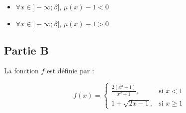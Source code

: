 \documentclass[12pt,a4paper]{article}
\begin{document}
\begin{itemize}
          \begin{center}
          \end{center}
          \begin{itemize}
              \item $\forall x \in ]-\infty ; \beta[$, $\mu(x)-1 < 0 $
              \item $\forall x \in ]-\infty ; \beta[$, $\mu(x)-1 > 0 $
          \end{itemize}
\end{itemize}

\subsection*{Partie B}

La fonction $f$ est définie par :

\[
    f(x) =
    \begin{cases}
        \frac{2(x^3+1)}{x^2+1}, & \text{si } x < 1    \\[10pt]
        1 + \sqrt{2x -1},       & \text{si } x \geq 1
    \end{cases}
\]
\end{document}
